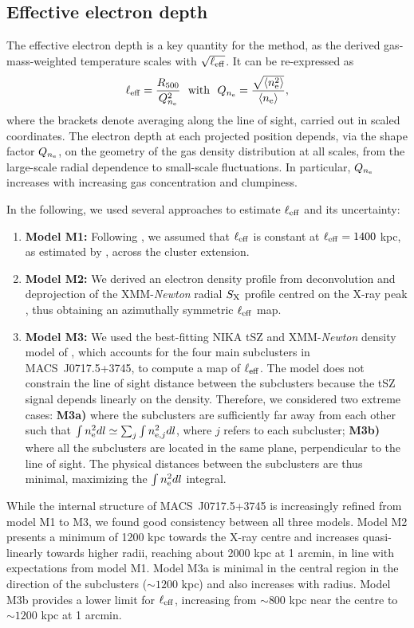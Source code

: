 \documentclass[twocolumn,traditabstract]{aa}
\def\xe {n_{\rm e}}
\begin{document}
\subsection{Effective electron depth}
The effective electron depth is a key quantity for the method, as the derived gas-mass-weighted temperature scales with $\sqrt{\ell_{\rm eff}}$. It can be re-expressed as
\begin{equation}
\ell_{\rm eff} = \frac{R_{500}}{Q_{n_{\rm e}}^2}~~{\rm with}~~Q_{n_{\rm e}} = \frac{ \sqrt{\langle \xe^2\rangle}}{ \langle\xe\rangle},
\label{eq:Q_ne}
\end{equation}
where the brackets denote averaging along the line of sight, carried out in scaled coordinates. The electron depth at each projected position depends, via the shape factor $Q_{n_{\rm e}}$, on the geometry of the gas density distribution at all scales, from the large-scale radial dependence to small-scale fluctuations. In particular, $Q_{n_{\rm e}}$ increases with increasing gas concentration and clumpiness.

In the following, we used several approaches to estimate $\ell_{\rm eff}$ and its uncertainty:
\begin{enumerate}
\item {\bf Model M1:} Following \cite{Sayers2013}, we assumed that $\ell_{\rm eff}$ is constant at $\ell_{\rm eff}=1400$ kpc, as estimated by \citet{Mroczkowski2012}, across the cluster extension. 
\item {\bf Model M2:} We derived an electron density profile from deconvolution and deprojection of the XMM-\textit{Newton} radial $S_{\rm X}$ profile centred on the X-ray peak \citep{Croston2006}, thus obtaining an azimuthally symmetric $\ell_{\rm eff}$ map. 
\item {\bf Model M3:} We used the best-fitting NIKA tSZ and XMM-\textit{Newton} density model of \cite{Adam2016b}, which accounts for the four main subclusters in \mbox{MACS~J0717.5+3745}, to compute a map of $\ell_{\rm eff}$. The model does not constrain the line of sight distance between the subclusters because the tSZ signal depends linearly on the density. Therefore, we considered two extreme cases: {\bf M3a)} where the subclusters are sufficiently far away from each other such that $\int n_{\rm e}^2 dl \simeq \sum_j \int n_{{\rm e},j}^2 dl$, where $j$ refers to each subcluster; {\bf M3b)} where all the subclusters are located in the same plane, perpendicular to the line of sight. The physical distances between the subclusters are thus minimal, maximizing the $\int n_{\rm e}^2 dl$ integral.
\end{enumerate}
While the internal structure of \mbox{MACS~J0717.5+3745} is increasingly refined from model M1 to M3, we found good consistency between all three models. Model M2 presents a minimum of 1200 kpc towards the X-ray centre and increases quasi-linearly towards higher radii, reaching about 2000 kpc at 1 arcmin, in line with expectations from model M1. Model M3a is minimal in the central region in the direction of the subclusters ($\sim 1200$ kpc) and also increases with radius. Model M3b provides a lower limit for $\ell_{\rm eff}$, increasing from $\sim 800$ kpc near the centre to $\sim 1200$ kpc at 1 arcmin.
\end{document}
